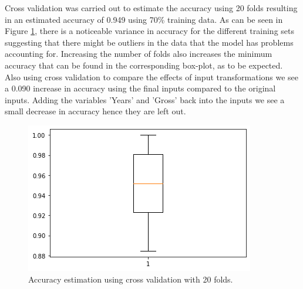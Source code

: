\documentclass[../../project.tex]{subfiles}
\begin{document}
	Cross validation was carried out to estimate the accuracy using 20 folds resulting in an estimated accuracy of 0.949 using 70\% training data. As can be seen in Figure \ref{fig:boxplotQDA}, there is a noticeable variance in accuracy for the different training sets suggesting that there might be outliers in the data that the model has problems accounting for. Increasing the number of folds also increases the minimum accuracy that can be found in the corresponding box-plot, as to be expected. Also using cross validation to compare the effects of input transformations we see a 0.090 increase in accuracy using the final inputs compared to the original inputs. Adding the variables 'Years' and 'Gross' back into the inputs we see a small decrease in accuracy hence they are left out.
	\begin{figure}[ht]
		\centering
    	\includegraphics[scale=0.7]{project/tex/QDAboxplot.png}
		\caption{Accuracy estimation using cross validation with 20 folds.}
		\label{fig:boxplotQDA}
    \end{figure}
    
\end{document}
